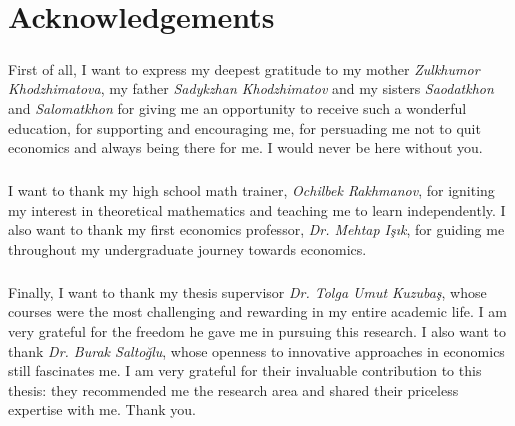 \chapter*{Acknowledgements}
\vspace{20pt}
  \paragraph*{}First of all, I want to express my deepest gratitude to my mother \textit{Zulkhumor Khodzhimatova}, my father \textit{Sadykzhan Khodzhimatov} and my sisters \textit{Saodatkhon} and \textit{Salomatkhon} for giving me an opportunity to receive such a wonderful education, for supporting and encouraging me, for persuading me not to quit economics and always being there for me. I would never be here without you.
  \paragraph*{}I want to thank my high school math trainer, \textit{Ochilbek Rakhmanov}, for igniting my interest in theoretical mathematics and teaching me to learn independently. I also want to thank my first economics professor, \textit{Dr. Mehtap Işık}, for guiding me throughout my undergraduate journey towards economics.
  \paragraph*{}Finally, I want to thank my thesis supervisor \textit{Dr. Tolga Umut Kuzubaş}, whose courses were the most challenging and rewarding in my entire academic life. I am very grateful for the freedom he gave me in pursuing this research. I also want to thank \textit{Dr. Burak Saltoğlu}, whose openness to innovative approaches in economics still fascinates me. I am very grateful for their invaluable contribution to this thesis: they recommended me the research area and shared their priceless expertise with me. Thank you.   
